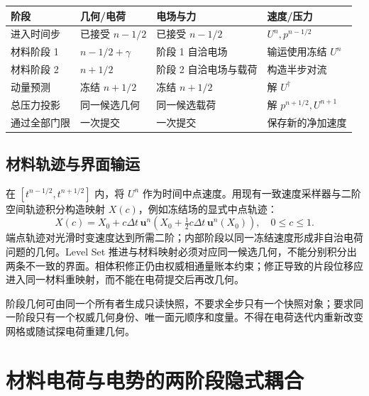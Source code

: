 \documentclass[UTF8,a4paper,11pt,fontset=fandol]{ctexart}
\numberwithin{equation}{section}
\newcommand{\dt}{\Delta t}\newcommand{\dd}{\,\mathrm d}
\newcommand{\uu}{\bm u}\newcommand{\UU}{\bm U}\newcommand{\FF}{\bm F}
\begin{document}
\noindent\begin{tabularx}{\textwidth}{@{}lXXX@{}}
\toprule 阶段 & 几何/电荷 & 电场与力 & 速度/压力\\\midrule
进入时间步 & 已接受 $n-1/2$ & 已接受 $n-1/2$ & $U^n,p^{n-1/2}$\\
材料阶段 1 & $n-1/2+\gamma$ & 阶段 1 自洽电场 & 输运使用冻结 $U^n$\\
材料阶段 2 & $n+1/2$ & 阶段 2 自洽电场与载荷 & 构造半步对流\\
动量预测 & 冻结 $n+1/2$ & 冻结 $n+1/2$ & 解 $U^\dagger$\\
总压力投影 & 同一候选几何 & 同一候选载荷 & 解 $p^{n+1/2},U^{n+1}$\\
通过全部门限 & 一次提交 & 一次提交 & 保存新的净加速度\\\bottomrule
\end{tabularx}

\subsection{材料轨迹与界面输运}
在 $[t^{n-1/2},t^{n+1/2}]$ 内，将 $U^n$ 作为时间中点速度。用现有一致速度采样器与二阶空间轨迹积分构造映射 $X(c)$，例如冻结场的显式中点轨迹：
\begin{equation}
 X(c)=X_0+c\dt\,\uu^n\!\left(X_0+\tfrac12c\dt\,\uu^n(X_0)\right),\quad0\le c\le1.
\end{equation}
端点轨迹对光滑时变速度达到所需二阶；内部阶段以同一冻结速度形成非自治电荷问题的几何。Level Set 推进与材料映射必须对应同一候选几何，不能分别积分出两条不一致的界面。相体积修正仍由权威相通量账本约束；修正导致的片段位移应进入同一材料重映射，而不能在电荷提交后再改几何。

阶段几何可由同一个所有者生成只读快照，不要求全步只有一个快照对象；要求同一阶段只有一个权威几何身份、唯一面元顺序和度量。不得在电荷迭代内重新改变网格或随试探电荷重建几何。

\section{材料电荷与电势的两阶段隐式耦合}
\end{document}
